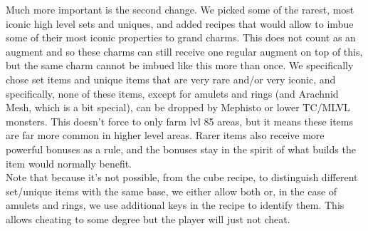 \documentclass[12pt,a4paper]{article}
\begin{document}
\begin{center}
\end{center}

Much more important is the second change. We picked some of the rarest, most iconic high level sets and uniques, and added recipes that would allow to imbue some of their most iconic properties to grand charms. This does not count as an augment and so these charms can still receive one regular augment on top of this, but the same charm cannot be imbued like this more than once. We specifically chose set items and unique items that are very rare and/or very iconic, and specifically, none of these items, except for amulets and rings (and Arachnid Mesh, which is a bit special), can be dropped by Mephisto or lower TC/MLVL monsters. This doesn't force to only farm lvl 85 areas, but it means these items are far more common in higher level areas. Rarer items also receive more powerful bonuses as a rule, and the bonuses stay in the spirit of what builds the item would normally benefit.\\

Note that because it's not possible, from the cube recipe, to distinguish different set/unique items with the same base, we either allow both or, in the case of amulets and rings, we use additional keys in the recipe to identify them. This allows cheating to some degree but the player will just not cheat.
\end{document}
